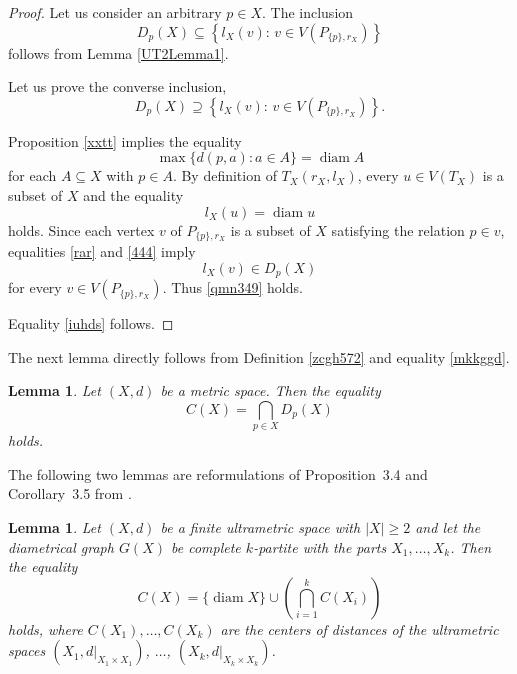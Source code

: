 \documentclass{raex}
\newtheorem{lem}[thm]{Lemma}
\theoremstyle{definition}
\theoremstyle{remark}
\numberwithin{equation}{section}
\begin{document}
\begin{proof}
Let us consider an arbitrary \(p\in X\).
The inclusion
\begin{equation*}
D_p(X)\subseteq
\left\{l_{X}(v):\, v\in V(P_{\{p\},r_X})\right\}
\end{equation*}
follows from Lemma \ref{UT2Lemma1}.

Let us prove the converse inclusion,
\begin{equation}
    \label{qmn349}
D_p(X)\supseteq
\left\{l_{X}(v):\, v\in V(P_{\{p\},r_X})\right\}.
\end{equation}

Proposition \ref{xxtt} implies the equality
\begin{equation}
    \label{444}
\max\{d(p,a):a\in A\}=\operatorname{diam}A
\end{equation}
for each $A\subseteq X$ with $p\in A$. By definition of $T_X(r_X,l_X)$, every $u\in V(T_X)$ is a subset of $X$ and the equality 
\begin{equation}\label{rar}
    l_X(u)=\operatorname{diam} u
\end{equation}
holds.
Since each vertex \(v\) of \(P_{\{p\},r_X}\) is a subset of \(X\) satisfying the relation \(p\in v\),
equalities \eqref{rar} and \eqref{444} imply
\begin{equation*}
l_X(v)\in D_p(X)
\end{equation*}
for every $v \in V(P_{\{p\},r_X})$.
Thus \eqref{qmn349} holds. 

Equality \eqref{iuhds} follows.
\end{proof}



The next lemma directly follows from Definition \ref{zcgh572} and equality \eqref{mkkggd}.





\begin{lem}\label{xute}
 Let $(X,d)$ be a metric space.
Then the equality
\begin{equation*}
    C(X)=\bigcap_{p\in X} D_p(X)
\end{equation*}
holds.
\end{lem}




The following two lemmas are reformulations of Proposition~3.4 and Corollary~3.5 from \cite{DovgosheyRovenska2026}.




\begin{lem}\label{suul}
Let $(X,d)$ be a finite ultrametric space with $|X|\geq 2$ and let the diametrical graph $G(X)$ be complete $k$-partite with the parts $X_1,\ldots,X_k$.
Then the equality
\begin{equation*}
C(X)=\{\operatorname{diam} X\}\cup\left(\bigcap_{i=1}^{k} C(X_i)\right)
\end{equation*}
holds, where $C(X_1),\dots,C(X_k)$ are the centers of distances of the ultrametric spaces $(X_1,d|_{X_1 \times X_1})$, $\dots$, $(X_k,d|_{X_k \times X_k})$.
\end{lem}
\end{document}
